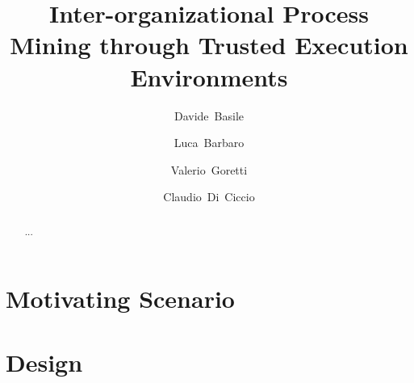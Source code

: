 \documentclass[runningheads]{llncs}
\begin{document}
%
\title{
}
%
%
\author{Davide~Basile \and
Luca~Barbaro \and
Valerio~Goretti \and Claudio~Di~Ciccio}
%
%
%
\title{Inter-organizational Process Mining through Trusted Execution Environments}
\maketitle

\begin{abstract}
...
\end{abstract}





\section{Motivating Scenario}\label{sec:motivating}

\section{Design}\label{sec:design}







\end{document}
